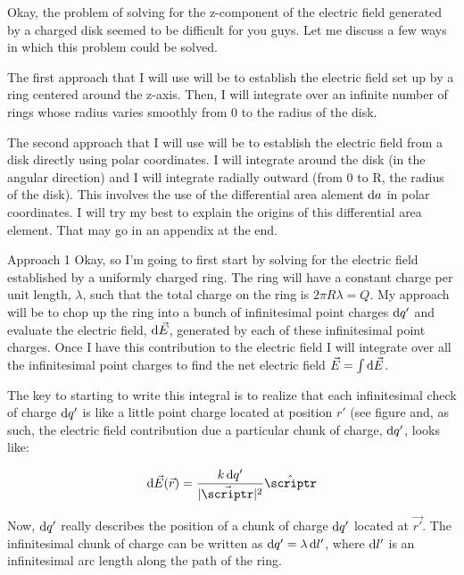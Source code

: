 \begin{homeworkProblem} 
    Okay, the problem of solving for the z-component of the electric
    field generated by a charged disk seemed to be difficult for you
    guys. Let me discuss a few ways in which this problem could be
    solved.
    
    The first approach that I will use will be to establish the
    electric field set up by a ring centered around the z-axis. Then, I
    will integrate over an infinite number of rings whose radius varies
    smoothly from 0 to the radius of the disk.

    The second approach that I will use will be to establish the
    electric field from a disk directly using polar coordinates. I will
    integrate around the disk (in the angular direction) and I will
    integrate radially outward (from 0 to R, the radius of the disk).
    This involves the use of the differential area alement $\mathop{}\!\mathrm{d} a$ in
    polar coordinates. I will try my best to explain the origins of this
    differential area element. That may go in an appendix at the end.

    \begin{homeworkSection}{Approach 1}
        Okay, so I'm going to first start by solving for the electric
        field established by a uniformly charged ring. The ring will
        have a constant charge per unit length, $\lambda$, such that the
        total charge on the ring is $2\pi R \lambda = Q$. My approach
        will be to chop up the ring into a bunch of infinitesimal point
        charges $\mathop{}\!\mathrm{d} q'$ and evaluate the electric field, $\mathop{}\!\mathrm{d} \vec{E}$,
        generated by each of these infinitesimal point charges. Once I
        have this contribution to the electric field I will integrate
        over all the infinitesimal point charges to find the net
        electric field $\vec{E} = \int \mathop{}\!\mathrm{d} \vec{E}$. 

        The key to starting to write this integral is to realize that
        each infinitesimal check of charge $\mathop{}\!\mathrm{d} q'$ is like a little point
        charge located at position $r'$ (see figure %
        and, as such, the electric field contribution due a particular
        chunk of charge, $\mathop{}\!\mathrm{d} q'$, looks like:

        \[ \diff \vec{E}(\vec{r}) = \frac{k \diff q'}{|\vec{\scriptr}|^2}
        \hat{\scriptr} \]

        Now, $\mathop{}\!\mathrm{d} q'$ really describes the position of a chunk of charge
        $\mathop{}\!\mathrm{d} q'$ located at $\vec{r'}$. The infinitesimal chunk of charge
        can be written as $\mathop{}\!\mathrm{d} q' = \lambda \mathop{}\!\mathrm{d} l'$, where $\mathop{}\!\mathrm{d}
        l'$ is an infinitesimal arc length along the path of the ring.


\end{homeworkSection}
\end{homeworkProblem}
